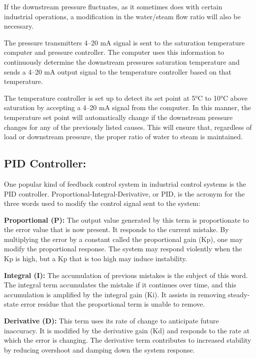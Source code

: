 If the downstream pressure fluctuates, as it sometimes does with certain
industrial operations, a modification in the water/steam flow ratio will
also be necessary.


The pressure transmitter\textquotesingle s 4--20 mA signal is sent to
the saturation temperature computer and pressure controller. The
computer uses this information to continuously determine the downstream
pressure\textquotesingle s saturation temperature and sends a 4--20 mA
output signal to the temperature controller based on that temperature.

The temperature controller is set up to detect its set point at 5°C to
10°C above saturation by accepting a 4--20 mA signal from the computer.
In this manner, the temperature set point will automatically change if
the downstream pressure changes for any of the previously listed causes.
This will ensure that, regardless of load or downstream pressure, the
proper ratio of water to steam is maintained.


\subsection{PID Controller:\cite{pid}}

One popular kind of feedback control system in industrial control
systems is the PID controller. Proportional-Integral-Derivative, or PID,
is the acronym for the three words used to modify the control signal
sent to the system:

\textbf{Proportional (P):} The output value generated by this term is
proportionate to the error value that is now present. It responds to the
current mistake. By multiplying the error by a constant called the
proportional gain (Kp), one may modify the proportional response. The
system may respond violently when the Kp is high, but a Kp that is too
high may induce instability.

\textbf{Integral (I):} The accumulation of previous mistakes is the
subject of this word. The integral term accumulates the mistake if it
continues over time, and this accumulation is amplified by the integral
gain (Ki). It assists in removing steady-state error residue that the
proportional term is unable to remove.

\textbf{Derivative (D):} This term uses its rate of change to anticipate
future inaccuracy. It is modified by the derivative gain (Kd) and
responds to the rate at which the error is changing. The derivative term
contributes to increased stability by reducing overshoot and damping
down the system response.

